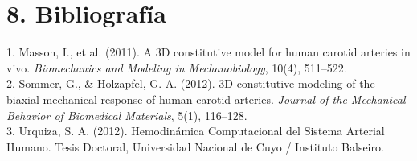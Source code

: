 \documentclass[10pt,a4paper]{article}
\begin{document}
\section{8. Bibliografía}
1. Masson, I., et al. (2011). A 3D constitutive model for human carotid arteries in vivo. \textit{Biomechanics and Modeling in Mechanobiology}, 10(4), 511--522.\\
2. Sommer, G., \& Holzapfel, G. A. (2012). 3D constitutive modeling of the biaxial mechanical response of human carotid arteries. \textit{Journal of the Mechanical Behavior of Biomedical Materials}, 5(1), 116--128.\\
3. Urquiza, S. A. (2012). Hemodinámica Computacional del Sistema Arterial Humano. Tesis Doctoral, Universidad Nacional de Cuyo / Instituto Balseiro.
\end{document}
